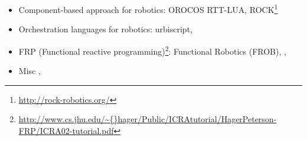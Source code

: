 \begin{itemize}
\item Component-based approach for robotics: OROCOS
  RTT-LUA\cite{Klotzbucher:2010fk},
  ROCK\footnote{\url{http://rock-robotics.org/}} \cite{Joyeux:2011fk}
\item Orchestration languages for robotics:
  urbiscript\cite{Baillie:2005},
\item FRP (Functional reactive
  programming)\footnote{\url{http://www.cs.jhu.edu/\~{}hager/Public/ICRAtutorial/HagerPeterson-FRP/ICRA02-tutorial.pdf}}:
  Functional Robotics (FROB)\cite{Hager:1999fk},
  \cite{Peterson:1999lk}, \cite{Pembeci:2002fc}
\item Misc \cite{Thiry:2008ys}, \cite{Proetzsch:2010vn}
\end{itemize}

